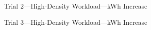 \documentclass[10pt]{report}
\begin{document}
\begin{landscape}
\begin{figure}[!h]
    \caption{Trial 2---High-Density Workload---kWh Increase}
\end{figure}
\begin{figure}[!h]
  \centering

    \caption{Trial 3---High-Density Workload---kWh Increase}
\end{figure}
\begin{figure}[!h]
  \centering


\end{figure}
\end{landscape}
\end{document}
